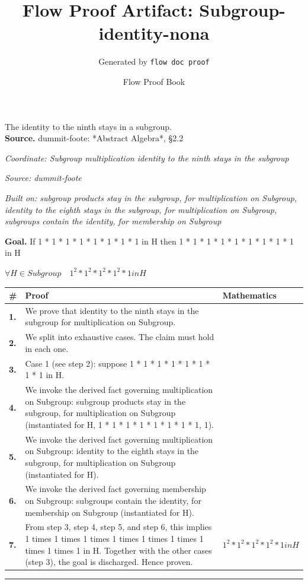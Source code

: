 \documentclass[11pt]{article}
\title{Flow Proof Artifact: Subgroup-identity-nona}
\author{Generated by \texttt{flow doc proof}}
\date{Flow Proof Book}
\theoremstyle{definition}
\begin{document}
\maketitle
The identity to the ninth stays in a subgroup.\\[0.5em]
\textbf{Source.} dummit-foote: *Abstract Algebra*, §2.2\\[0.5em]
\bigskip
{}\par
\smallskip\noindent\textit{Coordinate: Subgroup \cdot multiplication \cdot identity to the ninth stays in the subgroup}\par
\smallskip\noindent\textit{Source: dummit-foote}\par
\smallskip\noindent\textit{Built on: subgroup products stay in the subgroup, for multiplication on Subgroup, identity to the eighth stays in the subgroup, for multiplication on Subgroup, subgroups contain the identity, for membership on Subgroup}\par
\medskip
\noindent\textbf{Goal.} If 1 * 1 * 1 * 1 * 1 * 1 * 1 * 1 in H then 1 * 1 * 1 * 1 * 1 * 1 * 1 * 1 * 1 in H\par
\noindent$\displaystyle \forall H \in Subgroup\quad 1^{2} * 1^{2} * 1^{2} * 1^{2} * 1 in H$\par
\medskip
\noindent
\begin{tabular}{@{} >{\raggedright\arraybackslash}p{} >{\raggedright\arraybackslash}p{} >{\raggedleft\arraybackslash}p{} @{}}
\textbf{\#} & \textbf{Proof} & \textbf{Mathematics} \\
\midrule
\textbf{1.} & We prove that identity to the ninth stays in the subgroup for multiplication on Subgroup. & \\[0.45em]
\textbf{2.} & We split into exhaustive cases. The claim must hold in each one. & \\[0.45em]
\textbf{3.} & Case 1 (see step 2): suppose 1 * 1 * 1 * 1 * 1 * 1 * 1 * 1 in H. & \\[0.45em]
\textbf{4.} & We invoke the derived fact governing multiplication on Subgroup: subgroup products stay in the subgroup, for multiplication on Subgroup (instantiated for H, 1 * 1 * 1 * 1 * 1 * 1 * 1 * 1, 1). & \\[0.45em]
\textbf{5.} & We invoke the derived fact governing multiplication on Subgroup: identity to the eighth stays in the subgroup, for multiplication on Subgroup (instantiated for H). & \\[0.45em]
\textbf{6.} & We invoke the derived fact governing membership on Subgroup: subgroups contain the identity, for membership on Subgroup (instantiated for H). & \\[0.45em]
\textbf{7.} & From step 3, step 4, step 5, and step 6, this implies 1 times 1 times 1 times 1 times 1 times 1 times 1 times 1 times 1 in H. Together with the other cases (step 3), the goal is discharged. Hence proven. & $\displaystyle 1^{2} * 1^{2} * 1^{2} * 1^{2} * 1 in H$ \\[0.45em]
\bottomrule
\end{tabular}
\label{thm:Subgroup-multiplication-identity_to_the_ninth_stays_in_the_subgroup}
\par\medskip\hrule
\end{document}
